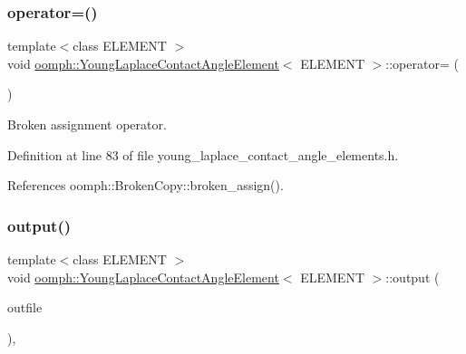 \mbox{\label{classoomph_1_1YoungLaplaceContactAngleElement_a7c0ab1be7efdcb28da20c431aed61b4c}} 
\subsubsection{\texorpdfstring{operator=()}{operator=()}}
{\footnotesize\ttfamily template$<$class E\+L\+E\+M\+E\+NT $>$ \\
void \hyperlink{classoomph_1_1YoungLaplaceContactAngleElement}{oomph\+::\+Young\+Laplace\+Contact\+Angle\+Element}$<$ E\+L\+E\+M\+E\+NT $>$\+::operator= (\begin{DoxyParamCaption}\item[{const \hyperlink{classoomph_1_1YoungLaplaceContactAngleElement}{Young\+Laplace\+Contact\+Angle\+Element}$<$ E\+L\+E\+M\+E\+NT $>$ \&}]{ }\end{DoxyParamCaption})\hspace{0.3cm}{\ttfamily [inline]}}



Broken assignment operator. 



Definition at line 83 of file young\+\_\+laplace\+\_\+contact\+\_\+angle\+\_\+elements.\+h.



References oomph\+::\+Broken\+Copy\+::broken\+\_\+assign().

\mbox{\label{classoomph_1_1YoungLaplaceContactAngleElement_afc1ae43e1b279e52c7d3a030f1740d93}} 
\subsubsection{\texorpdfstring{output()}{output()}\hspace{0.1cm}{\footnotesize\ttfamily [1/4]}}
{\footnotesize\ttfamily template$<$class E\+L\+E\+M\+E\+NT $>$ \\
void \hyperlink{classoomph_1_1YoungLaplaceContactAngleElement}{oomph\+::\+Young\+Laplace\+Contact\+Angle\+Element}$<$ E\+L\+E\+M\+E\+NT $>$\+::output (\begin{DoxyParamCaption}\item[{std\+::ostream \&}]{outfile }\end{DoxyParamCaption})\hspace{0.3cm}{\ttfamily [inline]}, {\ttfamily [virtual]}}

